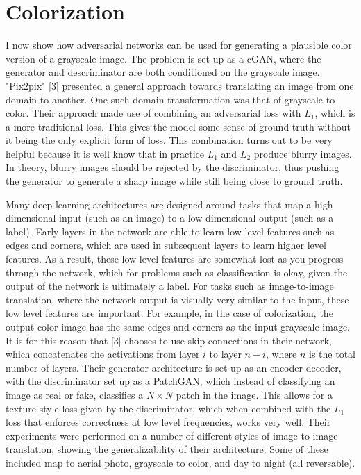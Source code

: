 \documentclass{article}
\begin{document}
\section{Colorization}
I now show how adversarial networks can be used for generating a plausible color version of a grayscale image. The problem is set up as a cGAN, where the generator and descriminator
are both conditioned on the grayscale image. "Pix2pix" [3] presented a general approach towards translating an image from one domain to another. One such domain transformation was that of
grayscale to color. Their approach made use of combining an adversarial loss with $L_1$, which is a more traditional loss. This gives the model some sense of ground truth without it
being the only explicit form of loss. This combination turns out to be very helpful because it is well know that in practice $L_1$ and $L_2$ produce blurry images. In theory, blurry
images should be rejected by the discriminator, thus pushing the generator to generate a sharp image while still being close to ground truth. \newline

\noindent Many deep learning architectures are designed around tasks that map a high dimensional input (such as an image) to a low dimensional output (such as a label). Early layers in
the network are able to learn low level features such as edges and corners, which are used in subsequent layers to learn higher level features. As a result, these low level features are
somewhat lost as you progress through the network, which for problems such as classification is okay, given the output of the network is ultimately a label. For tasks such as
image-to-image translation, where the network output is visually very similar to the input, these low level features are important. For example, in the case of colorization, the
output color image has the same edges and corners as the input grayscale image. It is for this reason that [3] chooses to use skip connections in their network, which concatenates the
activations from layer $i$ to layer $n-i$, where $n$ is the total number of layers. Their generator architecture is set up as an encoder-decoder, with the discriminator set up as a PatchGAN,
which instead of classifying an image as real or fake, classifies a $N \times N$ patch in the image. This allows for a texture style loss given by the discriminator, which when combined with
the $L_1$ loss that enforces correctness at low level frequencies, works very well. Their experiments were performed on a number of different styles of image-to-image translation, showing
the generalizability of their architecture. Some of these included map to aerial photo, grayscale to color, and day to night (all reversable). \newline
\end{document}
